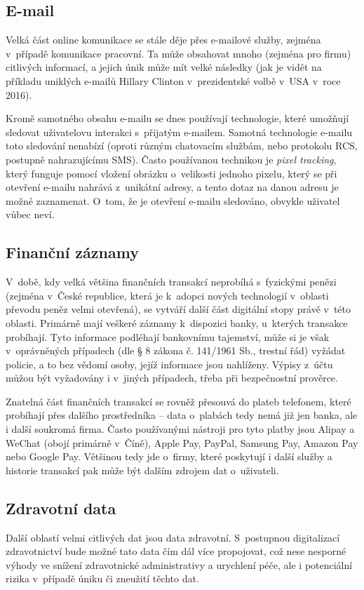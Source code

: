 \subsection{E-mail}
Velká část online komunikace se stále děje přes e-mailové služby, zejména v~případě komunikace pracovní. Ta může obsahovat mnoho (zejména pro firmu) citlivých informací, a jejich únik může mít velké následky (jak je vidět na příkladu uniklých e-mailů Hillary Clinton v~prezidentské volbě v~USA v~roce 2016).

Kromě samotného obsahu e-mailu se dnes používají technologie, které umožňují sledovat uživatelovu interakci s~přijatým e-mailem. Samotná technologie e-mailu toto sledování nenabízí (oproti různým chatovacím službám, nebo protokolu RCS, postupně nahrazujícímu SMS). Často používanou technikou je \textit{pixel tracking}, který funguje pomocí vložení  obrázku o~velikosti jednoho pixelu, který se při otevření e-mailu nahrává z~unikátní adresy, a tento dotaz na danou adresu je možné zaznamenat. O~tom, že je otevření e-mailu sledováno, obvykle uživatel vůbec neví.

\subsection{Finanční záznamy}
V~době, kdy velká většina finančních transakcí neprobíhá s~fyzickými penězi (zejména v~České republice, která je k~adopci nových technologií v~oblasti převodu peněz velmi otevřená), se vytváří další část digitální stopy právě v~této oblasti.
Primárně mají veškeré záznamy k~dispozici banky, u~kterých transakce probíhají. Tyto informace podléhají bankovnímu tajemství, může si je však v~oprávněných případech (dle § 8 zákona č. 141/1961 Sb., trestní řád) vyžádat policie, a to bez vědomí osoby, jejíž informace jsou nahlíženy. Výpisy z~účtu můžou být vyžadovány i v~jiných případech, třeba při bezpečnostní prověrce.

Znatelná část finančních transakcí se rovněž přesouvá do plateb telefonem, které probíhají přes dalšího prostředníka -- data o~plabách tedy nemá již jen banka, ale i další soukromá firma. Často používanými nástroji pro tyto platby jsou Alipay a WeChat (obojí primárně v~Číně), Apple Pay, PayPal, Samsung Pay, Amazon Pay nebo Google Pay. Většinou tedy jde o~firmy, které poskytují i další služby a historie transakcí pak může být dalším zdrojem dat o~uživateli.

\subsection{Zdravotní data}
Další oblastí velmi citlivých dat jsou data zdravotní. S~postupnou digitalizací zdravotnictví bude možné tato data čím dál více propojovat, což nese nesporné výhody ve snížení zdravotnické administrativy a urychlení péče, ale i potenciální rizika v~případě úniku či zneužití těchto dat.

